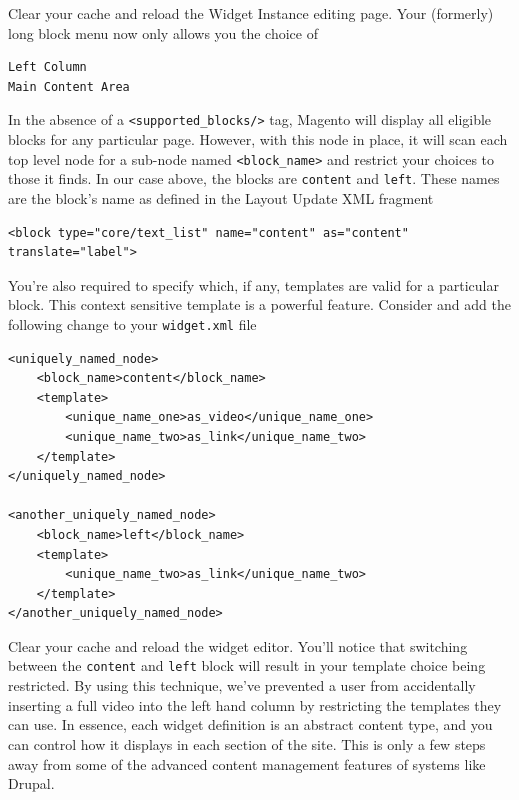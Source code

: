 \documentclass[oneside]{book}
\begin{document}
Clear your cache and reload the Widget Instance editing page.  Your (formerly) long block menu now only allows you the choice of

\begin{lstlisting}
Left Column
Main Content Area

\end{lstlisting}


In the absence of a \footnotesize\texttt{\textless supported\_blocks/\textgreater } \normalsize  tag, Magento will display all eligible blocks for any particular page.  However, with this node in place, it will scan each top level node for a sub-node named \footnotesize\texttt{\textless block\_name\textgreater } \normalsize  and restrict your choices to those it finds.  In our case above, the blocks are \footnotesize\texttt{content} \normalsize  and \footnotesize\texttt{left}\normalsize.  These names are the block's name as defined in the Layout Update XML fragment

\begin{lstlisting}
<block type="core/text_list" name="content" as="content" translate="label">

\end{lstlisting}


You're also required to specify which, if any, templates are valid for a particular block.  This context sensitive template is a powerful feature.  Consider and add the following change to your \footnotesize\texttt{widget.xml} \normalsize  file

\begin{lstlisting}
<uniquely_named_node>
    <block_name>content</block_name>
    <template>
        <unique_name_one>as_video</unique_name_one>
        <unique_name_two>as_link</unique_name_two>
    </template>
</uniquely_named_node>

<another_uniquely_named_node>
    <block_name>left</block_name>
    <template>
        <unique_name_two>as_link</unique_name_two>
    </template>
</another_uniquely_named_node>

\end{lstlisting}


Clear your cache and reload the widget editor.  You'll notice that switching between the \footnotesize\texttt{content} \normalsize  and \footnotesize\texttt{left} \normalsize  block will result in your template choice being restricted.  By using this technique, we've prevented a user from accidentally inserting a full video into the left hand column by restricting the templates they can use.  In essence, each widget definition is an abstract content type, and you can control how it displays in each section of the site.  This is only a few steps away from some of the advanced content management features of systems like Drupal.
\end{document}
